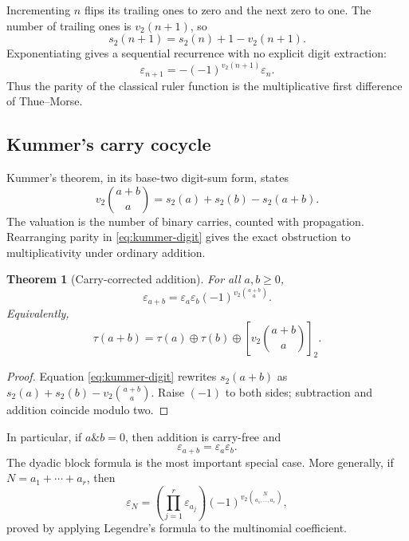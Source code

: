 \documentclass[11pt,oneside]{article}
\newtheorem{theorem}{Theorem}[section]
\theoremstyle{definition}
\theoremstyle{remark}
\newcommand{\wt}{s_2}
\newcommand{\vtwo}{v_2}
\newcommand{\eps}{\varepsilon}
\newcommand{\xor}{\mathbin{\oplus}}
\newcommand{\bitand}{\mathbin{\&}}
\newcommand{\res}[2]{\left[#1\right]_{#2}}
\begin{document}
Incrementing \(n\) flips its trailing ones to zero and the next zero to one.  The number of
trailing ones is \(\vtwo(n+1)\), so
\begin{equation}
  \wt(n+1)=\wt(n)+1-\vtwo(n+1).                             \label{eq:weight-increment}
\end{equation}
Exponentiating gives a sequential recurrence with no explicit digit extraction:
\begin{equation}
  \boxed{
  \eps_{n+1}=-(-1)^{\vtwo(n+1)}\eps_n.}                    \label{eq:ruler-transition}
\end{equation}
Thus the parity of the classical ruler function is the multiplicative first difference of
Thue--Morse.

\subsection{Kummer's carry cocycle}

Kummer's theorem, in its base-two digit-sum form, states
\begin{equation}
  \vtwo\binom{a+b}{a}=\wt(a)+\wt(b)-\wt(a+b).               \label{eq:kummer-digit}
\end{equation}
The valuation is the number of binary carries, counted with propagation.  Rearranging parity
in \eqref{eq:kummer-digit} gives the exact obstruction to multiplicativity under ordinary
addition.

\begin{theorem}[Carry-corrected addition]
\label{thm:carry-corrected}
For all \(a,b\ge0\),
\begin{equation}
  \boxed{
  \eps_{a+b}=\eps_a\eps_b(-1)^{\vtwo\binom{a+b}{a}}.}       \label{eq:carry-corrected}
\end{equation}
Equivalently,
\begin{equation}
  \tau(a+b)=\tau(a)\xor\tau(b)\xor
    \res{\vtwo\binom{a+b}{a}}2.                            \label{eq:carry-corrected-bit}
\end{equation}
\end{theorem}

\begin{proof}
Equation \eqref{eq:kummer-digit} rewrites \(\wt(a+b)\) as
\(\wt(a)+\wt(b)-\vtwo\binom{a+b}{a}\).  Raise \((-1)\) to both sides; subtraction and
addition coincide modulo two.
\end{proof}

In particular, if \(a\bitand b=0\), then addition is carry-free and
\begin{equation}
  \eps_{a+b}=\eps_a\eps_b.                                  \label{eq:carry-free}
\end{equation}
The dyadic block formula is the most important special case.  More generally, if
\(N=a_1+\cdots+a_r\), then
\begin{equation}
  \eps_N=\left(\prod_{j=1}^r\eps_{a_j}\right)
  (-1)^{\vtwo\binom{N}{a_1,\ldots,a_r}},                    \label{eq:multinomial-carry}
\end{equation}
proved by applying Legendre's formula to the multinomial coefficient.
\end{document}
